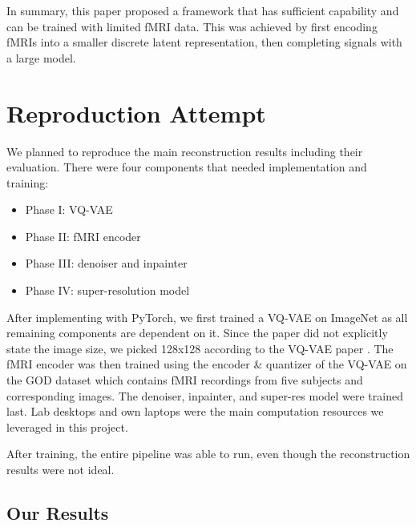 \documentclass{article}
\theoremstyle{plain}
\theoremstyle{definition}
\theoremstyle{remark}
\begin{document}
In summary, this paper proposed a framework that has sufficient capability and can be trained with limited fMRI data. This was achieved by first encoding fMRIs into a smaller discrete latent representation, then completing signals with a large model.


\section{Reproduction Attempt}

We planned to reproduce the main reconstruction results including their evaluation. There were four components that needed implementation and training:
\begin{itemize}
\item Phase I: VQ-VAE
\item Phase II: fMRI encoder
\item Phase III: denoiser and inpainter
\item Phase IV: super-resolution model
\end{itemize} 

After implementing with PyTorch, we first trained a VQ-VAE on ImageNet as all remaining components are dependent on it. Since the paper did not explicitly state the image size, we picked 128x128 according to the VQ-VAE paper \cite{oordNeuralDiscreteRepresentation2018}. The fMRI encoder was then trained using the encoder \& quantizer of the VQ-VAE on the GOD dataset \citep{horikawa2016} which contains fMRI recordings from five subjects and corresponding images. The denoiser, inpainter, and super-res model were trained last. Lab desktops and own laptops were the main computation resources we leveraged in this project.

After training, the entire pipeline was able to run, even though the reconstruction results were not ideal.

\subsection{Our Results}
\end{document}
